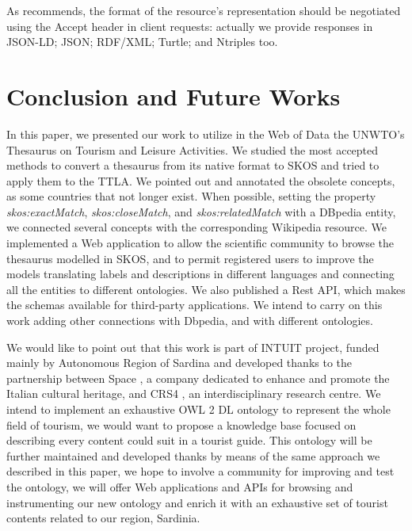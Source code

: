 \documentclass[runningheads,a4paper]{llncs}
\begin{document}
As  \cite{_Ref364511386} recommends, the format of the resource's representation should be negotiated using the Accept header in client requests: actually we provide responses in JSON-LD; JSON; RDF/XML; Turtle; and Ntriples too.

\section{Conclusion and Future Works}

In this paper, we presented our work to utilize in the Web of Data the UNWTO's Thesaurus on Tourism and Leisure Activities. We studied the most accepted methods to convert a thesaurus from its native format to SKOS and tried to apply them to the TTLA. We pointed out and annotated the obsolete concepts, as some countries that not longer exist. When possible, setting the property {\em skos:exactMatch}, {\em skos:closeMatch}, and {\em skos:relatedMatch} with a DBpedia entity, we connected several concepts with the corresponding Wikipedia resource. We implemented a Web application to allow the scientific community to browse the thesaurus modelled in SKOS, and to permit registered users to improve the models translating labels and descriptions in different languages and connecting all the entities to different ontologies. We also published a Rest API, which makes the schemas available for third-party applications. We intend to carry on this work adding other connections with Dbpedia, and with different ontologies.

We would like to point out that this work is part of INTUIT project, funded mainly by Autonomous Region of Sardina  \cite{_Ref364588308} and developed thanks to the partnership between Space  \cite{_Ref364588328}, a company dedicated to enhance and promote the Italian cultural heritage, and CRS4  \cite{_Ref364588343}, an interdisciplinary research centre. We intend to implement an exhaustive OWL 2 DL ontology to represent the whole field of tourism, we would want to propose a knowledge base focused on describing every content could suit in a tourist guide. This ontology will be further maintained and developed thanks by means of the same approach we described in this paper, we hope to involve a community for improving and test the ontology, we will offer Web applications and APIs for browsing and instrumenting our new ontology and enrich it with an exhaustive set of tourist contents related to our region, Sardinia.
\end{document}
